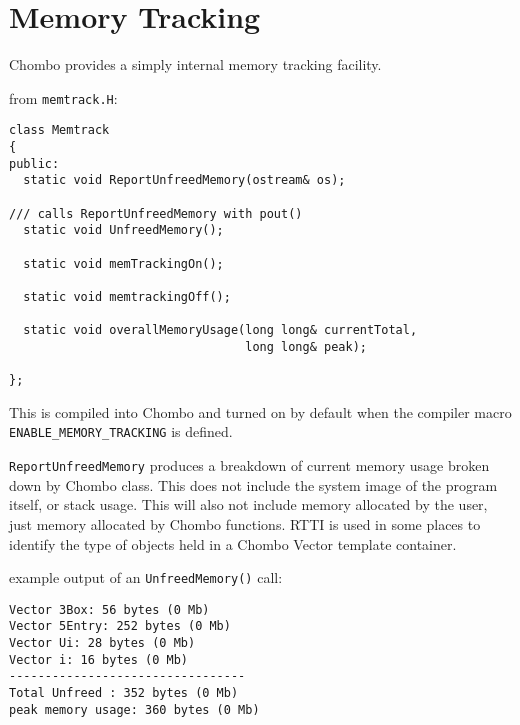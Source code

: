 
\section{Memory Tracking}

  Chombo provides a simply internal memory tracking facility.  

from \verb+memtrack.H+:
\begin{verbatim}
class Memtrack
{
public:
  static void ReportUnfreedMemory(ostream& os);

/// calls ReportUnfreedMemory with pout()
  static void UnfreedMemory();

  static void memTrackingOn();

  static void memtrackingOff();

  static void overallMemoryUsage(long long& currentTotal, 
                                 long long& peak);

};
\end{verbatim}

This is compiled into Chombo and turned on by default when 
the compiler macro \verb|ENABLE_MEMORY_TRACKING| is defined.

\verb+ReportUnfreedMemory+ produces a breakdown of current memory
usage broken down by Chombo class.  This does not include the system
image of the program itself, or stack usage.  This will also not
include memory allocated by the user, just memory allocated by
Chombo functions. RTTI is used in some places to identify the
type of objects held in a Chombo Vector template container.

example output of an \verb+UnfreedMemory()+ call:
\begin{verbatim}
Vector 3Box: 56 bytes (0 Mb)
Vector 5Entry: 252 bytes (0 Mb)
Vector Ui: 28 bytes (0 Mb)
Vector i: 16 bytes (0 Mb)
---------------------------------
Total Unfreed : 352 bytes (0 Mb)
peak memory usage: 360 bytes (0 Mb)
\end{verbatim}
